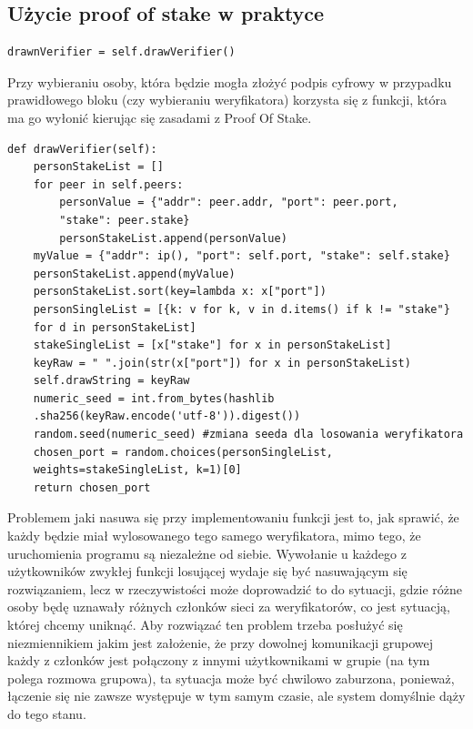 \subsection{Użycie proof of stake w praktyce}
\begin{lstlisting}
drawnVerifier = self.drawVerifier()
\end{lstlisting}
Przy wybieraniu osoby, która będzie mogła złożyć podpis cyfrowy w przypadku prawidłowego bloku (czy wybieraniu weryfikatora) korzysta się z funkcji, która ma go wyłonić kierując się zasadami z Proof Of Stake.
\begin{lstlisting}
def drawVerifier(self):
    personStakeList = []
    for peer in self.peers:
        personValue = {"addr": peer.addr, "port": peer.port,
        "stake": peer.stake}
        personStakeList.append(personValue)
    myValue = {"addr": ip(), "port": self.port, "stake": self.stake}
    personStakeList.append(myValue)
    personStakeList.sort(key=lambda x: x["port"])
    personSingleList = [{k: v for k, v in d.items() if k != "stake"} 
    for d in personStakeList]
    stakeSingleList = [x["stake"] for x in personStakeList]
    keyRaw = " ".join(str(x["port"]) for x in personStakeList)
    self.drawString = keyRaw
    numeric_seed = int.from_bytes(hashlib
    .sha256(keyRaw.encode('utf-8')).digest())
    random.seed(numeric_seed) #zmiana seeda dla losowania weryfikatora
    chosen_port = random.choices(personSingleList, 
    weights=stakeSingleList, k=1)[0]
    return chosen_port
\end{lstlisting}
Problemem jaki nasuwa się przy implementowaniu funkcji jest to, jak sprawić, że każdy będzie miał wylosowanego tego samego weryfikatora, mimo tego, że uruchomienia programu są niezależne od siebie. Wywołanie u każdego z użytkowników zwykłej funkcji losującej wydaje się być nasuwającym się rozwiązaniem, lecz w rzeczywistości może doprowadzić to do sytuacji, gdzie różne osoby będę uznawały różnych członków sieci za weryfikatorów, co jest sytuacją, której chcemy uniknąć. Aby rozwiązać ten problem trzeba posłużyć się niezmiennikiem jakim jest założenie, że przy dowolnej komunikacji grupowej każdy z członków jest połączony z innymi użytkownikami w grupie (na tym polega rozmowa grupowa), ta sytuacja może być chwilowo zaburzona, ponieważ, łączenie się nie zawsze występuje w tym samym czasie, ale system domyślnie dąży do tego stanu.

\vspace{1em}

